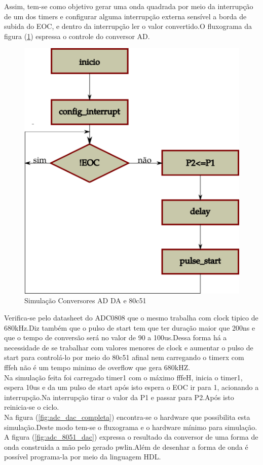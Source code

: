\documentclass{Fabiano_file}
\begin{document}
{Assim, tem-se como objetivo gerar uma onda quadrada por meio da interrupção de um dos timers e configurar alguma interrupção externa sensível a borda de subida
do EOC, e dentro da interrupção ler o valor convertido.O fluxograma da figura (\ref{fig:adc_dac_80c51_fluxograma}) espressa o controle do conversor AD.
	

\begin{figure}[h!]
\centering
\includegraphics[width=.47\textwidth]{adc_dac_80c51_fluxograma.pdf}
\caption{Simulação Conversores AD DA e 80c51}
\label{fig:adc_dac_80c51_fluxograma}
\end{figure}

Verifica-se pelo datasheet do ADC0808 que o mesmo trabalha com clock tipico de 680kHz.Diz também que o pulso de start tem que ter duração maior que 
200ns e que o tempo de conversão será no valor de 90 a 100us.Dessa forma há a necessidade de se trabalhar com valores menores de clock e aumentar o 
pulso de start para controlá-lo por meio do 80c51 afinal nem carregando o timerx com fffeh não é um tempo minimo de overflow que gera 680kHZ.\\
	
Na simulação feita foi carregado timer1 com o máximo fffeH, inicia o timer1, espera 10us e da um pulso de start após isto espera o EOC ir para 1, acionando a 
interrupção.Na interrupção tirar o valor da P1 e passar para P2.Após isto reinicia-se o ciclo.\\
 
Na figura (\ref{fig:adc_dac_completa}) encontra-se o hardware que possibilita esta simulação.Deste modo tem-se o fluxograma e o hardware mínimo para simulação.
A figura (\ref{fig:adc_8051_dac}) expressa o resultado da conversor de uma forma de onda construida a mão pelo gerado pwlin.Além de desenhar a forma de 
onda é possível programa-la por meio da linguagem HDL.

}
\end{document}
